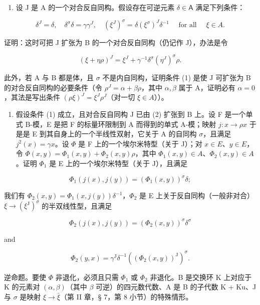 \begin{enumerate}
\def\labelenumi{\alph{enumi})}
\setcounter{enumi}{1}
\tightlist
\item
  设 J 是 A 的一个对合反自同构。假设存在可逆元素 \(\delta\in\mathsf{A}\) 满足下列条件：
\end{enumerate}

\[
\delta^ {J} = \delta , \quad \delta^ {\sigma} \delta = \gamma \gamma^ {J}, \quad (\xi^ {J}) ^ {\sigma} = \delta (\xi^ {\sigma}) ^ {J} \delta^ {- 1} \quad \text { for   all } \quad \xi \in A.\tag{1}
\]

证明：这时可把 J 扩张为 B 的一个对合反自同构（仍记作 J），办法是令

\[
(\xi + \eta \rho) ^ {J} = \xi^ {J} + \gamma^ {- 1} \delta^ {\sigma} (\eta^ {J}) ^ {\sigma} \rho .\tag{2}
\]

此外，若 A 与 B 都是体，且 \(\sigma\) 不是内自同构，证明条件 (1) 是使 J 可扩张为 B 的对合反自同构的必要条件（令 \(\rho^{J} = \alpha + \beta\rho\)，其中 \(\alpha, \beta\) 属于 A，证明必有 \(\alpha = 0\)，其法是写出条件 \((\rho\xi)^{J} = \xi^{J}\rho^{J}\)（对一切 \(\xi \in A\)））。

\begin{enumerate}
\def\labelenumi{\alph{enumi})}
\setcounter{enumi}{2}
\tightlist
\item
  假设条件 (1) 成立，且对合反自同构 J 已由 (2) 扩张到 B 上。设 F 是一个单式 B-模，E 是把 F 的标量环限制到 A 而得到的单式 A-模；映射 \(j: x \to \rho x\) 于是是 E 到其自身上的一个半线性双射，它关于 A 的自同构 \(\sigma\)，且满足 \(j^{2}(x) = \gamma x\)。设 \(\Phi\) 是 F 上的一个埃尔米特型（关于 J）；对 \(x \in E\)、\(y \in E\)，令 \(\Phi(x, y) = \Phi_{1}(x, y) + \Phi_{2}(x, y)\rho\)，其中 \(\Phi_{1}(x, y) \in A\)、\(\Phi_{2}(x, y) \in A\)。证明 \(\Phi_{1}\) 是 E 上的一个埃尔米特型（关于 J），且满足
\end{enumerate}

\[
\Phi_ {1} (j (x), j (y)) = (\Phi_ {1} (x, y)) ^ {\sigma} \delta ;
\]

我们有 \(\Phi_{2}(x,y)=\Phi_{1}(x,j(y))\delta^{-1}\)，\(\Phi_{2}\) 是 E 上关于反自同构（一般非对合）\(\xi\to(\xi^{\mathrm{J}})^{\sigma}\) 的半双线性型，且满足

\[
\Phi_ {2} (j (x), j (y)) = (\Phi_ {2} (x, y)) ^ {\sigma} \delta^ {\sigma}
\]

and

\[
\Phi_ {2} (y, x) = \gamma^ {\mathrm{J}} \delta^ {- 1} ((\Phi_ {2} (x, y)) ^ {\mathrm{J}}) ^ {\sigma}.
\]

逆命题。要使 \(\Phi\) 非退化，必须且只需 \(\Phi_{1}\) 或 \(\Phi_{2}\) 非退化。B 是交换环 K 上对应于 K 的元素对 \((\alpha, \beta)\)（其中 \(\beta\) 可逆）的四元数代数、A 是 B 的子代数 K + Ku、J 与 \(\sigma\) 是映射 \(\xi \to \bar{\xi}\)（第 II 章，§ 7，第 8 小节）的特殊情形。

